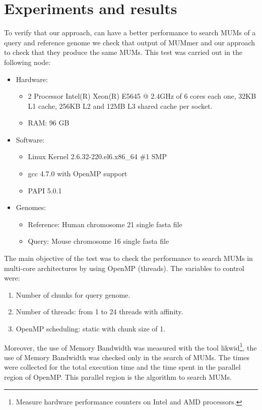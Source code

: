 \documentclass[3p,times]{elsarticle}
\begin{document}
\section{Experiments and results}
To verify that our approach, can have a better performance to search MUMs of a query and reference genome we check that output of MUMmer and our approach to check that they produce the same MUMs. This test was carried out in the following node:
\begin{itemize}
\item Hardware:  
\begin{itemize}
\item 2 Processor Intel(R) Xeon(R) E5645 @ 2.4GHz of 6 cores each one, 32KB L1 cache, 256KB L2 and 12MB L3 shared cache per socket.
\item RAM: 96 GB
\end{itemize} 
\item  Software: 
\begin{itemize}
\item Linux Kernel 2.6.32-220.el6.x86\_64 \#1 SMP
\item gcc 4.7.0 with OpenMP support
\item PAPI 5.0.1
\end{itemize}  
\item Genomes:
  \begin{itemize}
    \item Reference: Human chromosome 21 single fasta file
    \item Query: Mouse chromosome 16 single fasta file
  \end{itemize}
\end{itemize}
The main objective of the test was to check the performance to search MUMs in multi-core architectures by using OpenMP (threads). The variables to control were:
\begin{enumerate}
  \item Number of chunks for query genome.
  \item Number of threads: from 1 to 24 threads with affinity.
  \item OpenMP scheduling: static with chunk size of 1.
\end{enumerate}
Moreover, the use of Memory Bandwidth was measured with the tool likwid\footnote{Measure hardware performance counters on Intel and AMD processors.}, the use of Memory Bandwidth was checked only in the search of MUMs. The times were collected for the total execution time and the time spent in the parallel region of OpenMP. This parallel region is the algorithm to search MUMs.\\
\end{document}
